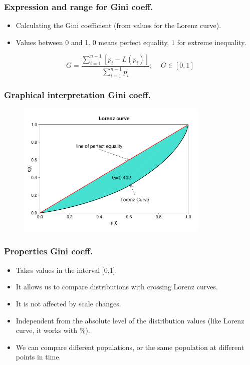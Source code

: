 \begin{frame} [fragile]
\frametitle{Expression and range for Gini coeff.}

\begin{itemize}
 \item Calculating the Gini coefficient (from values for the Lorenz curve).
 \item Values between 0 and 1. 0 means perfect equality, 1 for extreme inequality.
\end{itemize}

\begin{equation}
   G=\frac{\displaystyle\sum_{i=1}^{n-1}[p_i-L(p_i)]}{\displaystyle\sum_{i=1}^{n-1} p_i}; \;\;\;\; G \in [0,1]
\end{equation}

\end{frame}


\begin{frame}
\frametitle{Graphical interpretation Gini coeff.}

\begin{figure}
 \includegraphics[height=6.5cm]{figs/example-gini}
\end{figure}

\end{frame}


\begin{frame}
\frametitle{Properties Gini coeff.}

\begin{itemize}
\item Takes values in the interval [0,1].
\item It allows us to compare distributions with crossing Lorenz curves.
\item It is not affected by scale changes.
\item Independent from the absolute level of the distribution values (like Lorenz
curve, it works with \%).
\item We can compare different populations, or the same population at different
points in time.
\end{itemize}

\end{frame}

